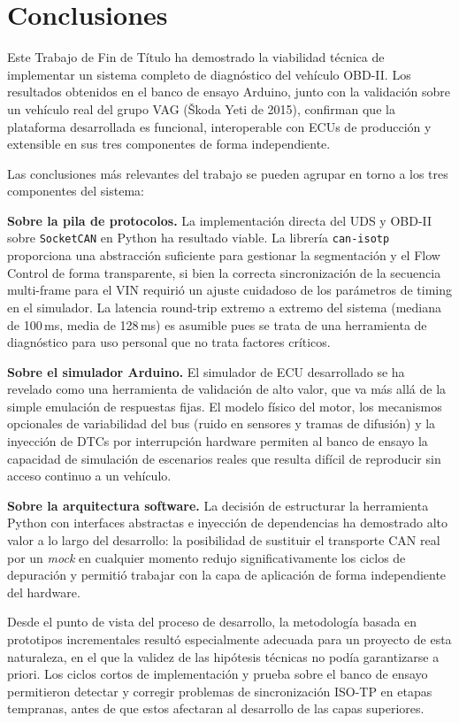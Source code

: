 \section{Conclusiones}
\label{sec:conclusiones}

Este Trabajo de Fin de Título ha demostrado la viabilidad técnica de implementar un sistema completo de diagnóstico del vehículo OBD-II. Los resultados obtenidos en el banco de ensayo Arduino, junto con la validación sobre un vehículo real del grupo VAG (Škoda Yeti de 2015), confirman que la plataforma desarrollada es funcional, interoperable con ECUs de producción y extensible en sus tres componentes de forma independiente.

Las conclusiones más relevantes del trabajo se pueden agrupar en torno a los tres componentes del sistema:

\textbf{Sobre la pila de protocolos.} La implementación directa del UDS y OBD-II sobre \texttt{SocketCAN} en Python ha resultado viable. La librería \texttt{can-isotp} proporciona una abstracción suficiente para gestionar la segmentación y el Flow Control de forma transparente, si bien la correcta sincronización de la secuencia multi-frame para el VIN requirió un ajuste cuidadoso de los parámetros de timing en el simulador. La latencia round-trip extremo a extremo del sistema (mediana de 100\,ms, media de 128\,ms) es asumible pues se trata de una herramienta de diagnóstico para uso personal que no trata factores críticos.

\textbf{Sobre el simulador Arduino.} El simulador de ECU desarrollado se ha revelado como una herramienta de validación de alto valor, que va más allá de la simple emulación de respuestas fijas. El modelo físico del motor, los mecanismos opcionales de variabilidad del bus (ruido en sensores y tramas de difusión) y la inyección de DTCs por interrupción hardware permiten al banco de ensayo la capacidad de simulación de escenarios reales que resulta difícil de reproducir sin acceso continuo a un vehículo.

\textbf{Sobre la arquitectura software.} La decisión de estructurar la herramienta Python con interfaces abstractas e inyección de dependencias ha demostrado alto valor a lo largo del desarrollo: la posibilidad de sustituir el transporte CAN real por un \textit{mock} en cualquier momento redujo significativamente los ciclos de depuración y permitió trabajar con la capa de aplicación de forma independiente del hardware.

Desde el punto de vista del proceso de desarrollo, la metodología basada en prototipos incrementales resultó especialmente adecuada para un proyecto de esta naturaleza, en el que la validez de las hipótesis técnicas no podía garantizarse a priori. Los ciclos cortos de implementación y prueba sobre el banco de ensayo permitieron detectar y corregir problemas de sincronización ISO-TP en etapas tempranas, antes de que estos afectaran al desarrollo de las capas superiores.

